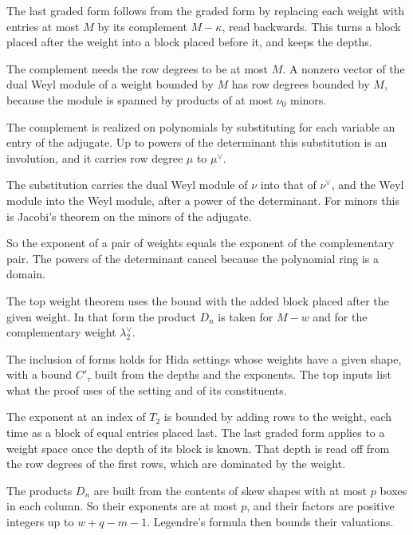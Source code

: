 The last graded form follows from the graded form by replacing each weight with entries at most $M$ by its
complement $M-\kappa$, read backwards. This turns a block placed after the weight into a block placed
before it, and keeps the depths.

The complement needs the row degrees to be at most $M$. A nonzero vector of the dual Weyl module of a
weight bounded by $M$ has row degrees bounded by $M$, because the module is spanned by products of at
most $\nu_0$ minors.

The complement is realized on polynomials by substituting for each variable an entry of the adjugate.
Up to powers of the determinant this substitution is an involution, and it carries row degree $\mu$ to
$\mu^\vee$.

The substitution carries the dual Weyl module of $\nu$ into that of $\nu^\vee$, and the Weyl module into
the Weyl module, after a power of the determinant. For minors this is Jacobi's theorem on the minors of
the adjugate.

So the exponent of a pair of weights equals the exponent of the complementary pair. The powers of the
determinant cancel because the polynomial ring is a domain.

The top weight theorem uses the bound with the added block placed after the given weight. In that form
the product $D_n$ is taken for $M-w$ and for the complementary weight $\lambda_2^\vee$.

The inclusion of forms holds for Hida settings whose weights have a given shape, with a bound
$C'_\tau$ built from the depths and the exponents. The top inputs list what the proof uses of the
setting and of its constituents.

The exponent at an index of $T_2$ is bounded by adding rows to the weight, each time as a block of equal
entries placed last. The last graded form applies to a weight space once the depth of its block is known.
That depth is read off from the row degrees of the first rows, which are dominated by the weight.

The products $D_n$ are built from the contents of skew shapes with at most $p$ boxes in each column. So
their exponents are at most $p$, and their factors are positive integers up to $w+q-m-1$. Legendre's
formula then bounds their valuations.

